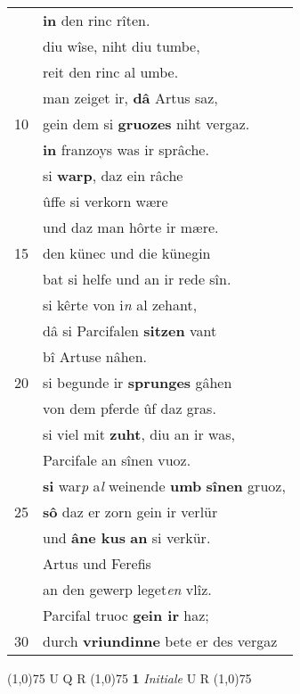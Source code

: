 \documentclass[8pt,a4paper,notitlepage]{article}
\begin{document}
\begin{table}[ht]
\begin{minipage}[t]{0.5\linewidth}
\begin{tabular}{rl}
 & \textbf{in} den rinc rîten.\\ 
 & diu wîse, niht diu tumbe,\\ 
 & reit den rinc al umbe.\\ 
 & man zeiget ir, \textbf{dâ} Artus saz,\\ 
10 & gein dem si \textbf{gruozes} niht vergaz.\\ 
 & \textbf{in} franzoys was ir sprâche.\\ 
 & si \textbf{warp}, daz ein râche\\ 
 & ûffe si verkorn wære\\ 
 & und daz man hôrte ir mære.\\ 
15 & den künec und die künegin\\ 
 & bat si helfe und an ir rede sîn.\\ 
 & si kêrte von i\textit{n} al zehant,\\ 
 & dâ si Parcifalen \textbf{sitzen} vant\\ 
 & bî Artuse nâhen.\\ 
20 & si begunde ir \textbf{sprunges} gâhen\\ 
 & von dem pferde ûf daz gras.\\ 
 & si viel mit \textbf{zuht}, diu an ir was,\\ 
 & Parcifale an sînen vuoz.\\ 
 & \textbf{si} war\textit{p} a\textit{l} weinende \textbf{umb} \textbf{sînen} gruoz,\\ 
25 & \textbf{sô} daz er zorn gein ir verlür\\ 
 & und \textbf{âne kus} \textbf{an} si verkür.\\ 
 & Artus und Ferefis\\ 
 & an den gewerp leget\textit{en} vlîz.\\ 
 & Parcifal truoc \textbf{gein ir} haz;\\ 
30 & durch \textbf{vriundinne} bete er des vergaz\\ 
\end{tabular}
\scriptsize
\line(1,0){75} \newline
U Q R \newline
\line(1,0){75} \newline
\textbf{1} \textit{Initiale} U R  \newline
\line(1,0){75} \newline

\end{minipage}
\end{table}
\end{document}
